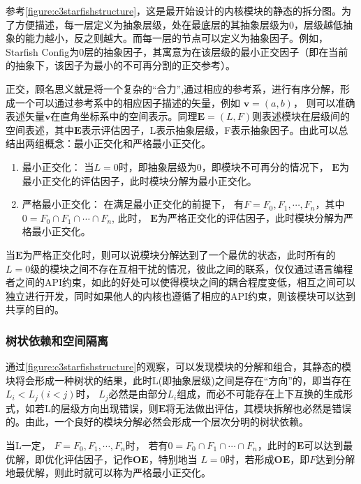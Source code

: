 参考\autoref{figure:c3starfishstructure}，这是最开始设计的内核模块的静态的拆分图。为了方便描述，每一层定义为抽象层级，处在最底层的其抽象层级为0，层级越低抽象的能力越小，反之则越大。而每一层的节点可以定义为抽象因子。例如，Starfish Config为0层的抽象因子，其寓意为在该层级的最小正交因子（即在当前的抽象下，该因子为最小的不可再分割的正交参考）。

正交，顾名思义就是将一个复杂的“合力”,通过相应的参考系，进行有序分解，形成一个可以通过参考系中的相应因子描述的矢量，例如 $\boldsymbol {v}=(a, b)$， 则可以准确表述矢量$\boldsymbol {v}$在直角坐标系中的空间表示。同理$\boldsymbol{E}=(L, F)$则表述模块在层级间的空间表述，其中$\boldsymbol{E}$表示评估因子，L表示抽象层级，F表示抽象因子。由此可以总结出两组概念：最小正交化和严格最小正交化。

\begin{enumerate}
    \item 最小正交化： 当$L=0$时，即抽象层级为0，即模块不可再分的情况下， $\boldsymbol{E}$为最小正交化的评估因子，此时模块分解为最小正交化。
    \item 严格最小正交化： 在满足最小正交化的前提下， 有$F = {F_{0}, F_{1}, \cdots, F_{n}}$，其中$0 = {F_{0} \cap F_{1} \cap \cdots \cap F_{n}}$, 此时， $\boldsymbol{E}$为严格正交化的评估因子，此时模块分解为严格最小正交化。
\end{enumerate}

当$\boldsymbol{E}$为严格正交化时，则可以说模块分解达到了一个最优的状态，此时所有的$L=0$级的模块之间不存在互相干扰的情况，彼此之间的联系，仅仅通过语言编程者之间的API约束，如此的好处可以使得模块之间的耦合程度变低，相互之间可以独立进行开发，同时如果他人的内核也遵循了相应的API约束，则该模块可以达到共享的目的。


\subsubsection{树状依赖和空间隔离}


通过\autoref{figure:c3starfishstructure}的观察，可以发现模块的分解和组合，其静态的模块将会形成一种树状的结果，此时L(即抽象层级)之间是存在“方向”的，即当存在$L_{i} < L_{j} (i < j)$时， $L_{j}$必然是由部分$L_{i}$组成，而必不可能存在上下互换的生成形式，如若L的层级方向出现错误，则$\boldsymbol{E}$将无法做出评估，其模块拆解也必然是错误的。由此，一个良好的模块分解必然会形成一个层次分明的树状依赖。

当L一定， $F = {F_{0}, F_{1}, \cdots, F_{n}}$时， 若有$0 = {F_{0} \cap F_{1} \cap \cdots \cap F_{n}}$，此时的$\boldsymbol{E}$可以达到最优解，即优化评估因子，记作$\boldsymbol{OE}$，特别地当 $L = 0$时，若形成$\boldsymbol{OE}$，即$F$达到分解地最优解，则此时就可以称为严格最小正交化。

